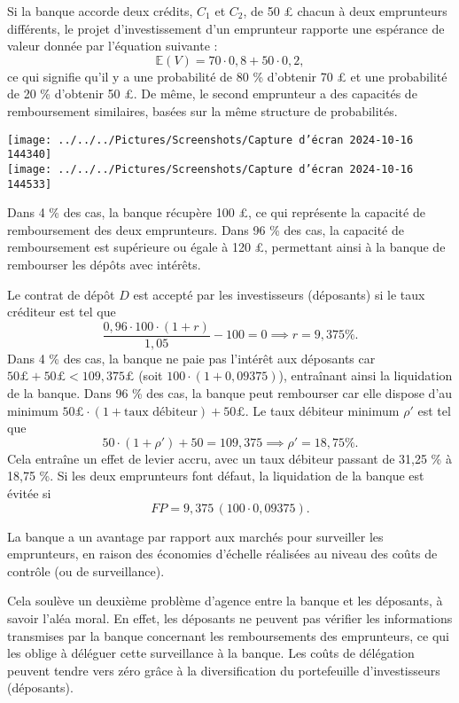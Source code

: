 \documentclass[a4paper, 12pt]{report}
\begin{document}
Si la banque accorde deux crédits, \( C_1 \) et \( C_2 \), de 50 £ chacun à deux emprunteurs différents, le projet d’investissement d’un emprunteur rapporte une espérance de valeur donnée par l'équation suivante : 
\[
\mathbb{E}(V) = 70 \cdot 0,8 + 50 \cdot 0,2,
\]
ce qui signifie qu'il y a une probabilité de 80 \% d'obtenir 70 £ et une probabilité de 20 \% d'obtenir 50 £. De même, le second emprunteur a des capacités de remboursement similaires, basées sur la même structure de probabilités.

\begin{center}
	\texttt{[image: ../../../Pictures/Screenshots/Capture d'écran 2024-10-16 144340]}
	\\
	\texttt{[image: ../../../Pictures/Screenshots/Capture d'écran 2024-10-16 144533]}
\end{center}

Dans 4 \% des cas, la banque récupère 100 £, ce qui représente la capacité de remboursement des deux emprunteurs. Dans 96 \% des cas, la capacité de remboursement est supérieure ou égale à 120 £, permettant ainsi à la banque de rembourser les dépôts avec intérêts.

Le contrat de dépôt \( D \) est accepté par les investisseurs (déposants) si le taux créditeur est tel que 
\[
\frac{0,96 \cdot 100 \cdot (1+r)}{1,05} - 100 = 0 \implies r = 9,375 \%.
\]
Dans 4 \% des cas, la banque ne paie pas l’intérêt aux déposants car \( 50 £ + 50 £ < 109,375 £ \) (soit \( 100 \cdot (1+0,09375) \)), entraînant ainsi la liquidation de la banque. Dans 96 \% des cas, la banque peut rembourser car elle dispose d'au minimum \( 50 £ \cdot (1 + \text{taux débiteur}) + 50 £ \). Le taux débiteur minimum \( \rho' \) est tel que 
\[
50 \cdot (1 + \rho') + 50 = 109,375 \implies \rho' = 18,75 \%.
\]
Cela entraîne un effet de levier accru, avec un taux débiteur passant de 31,25 \% à 18,75 \%. Si les deux emprunteurs font défaut, la liquidation de la banque est évitée si 
\[
FP = 9,375 \, (100 \cdot 0,09375).
\]

La banque a un avantage par rapport aux marchés pour surveiller les emprunteurs, en raison des économies d’échelle réalisées au niveau des coûts de contrôle (ou de surveillance). 

Cela soulève un deuxième problème d’agence entre la banque et les déposants, à savoir l’aléa moral. En effet, les déposants ne peuvent pas vérifier les informations transmises par la banque concernant les remboursements des emprunteurs, ce qui les oblige à déléguer cette surveillance à la banque. Les coûts de délégation peuvent tendre vers zéro grâce à la diversification du portefeuille d’investisseurs (déposants). 
\end{document}
